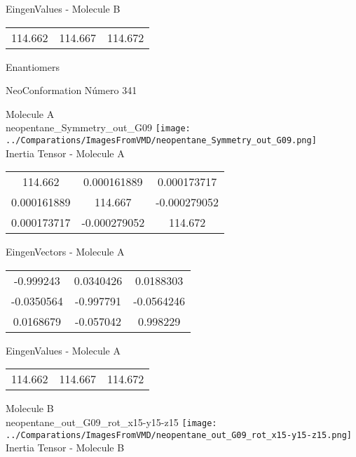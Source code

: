 \begin{multicols}{2}
\begin{center}
\vtab
 EingenValues - Molecule B     \\
\vtab
\begin{tabular}{|c c c|}
114.662	 & 	114.667	 & 	114.672	 \\
\end{tabular}

\end{center}
\end{multicols}
\begin{center}
\vtab
\vtab
\textcolor{NavyBlue}{\Large Enantiomers}
\end{center}

 \newpage

\vtab[-2cm]
\begin{center}
{\large NeoConformation \tab Número 341}
\end{center}
\begin{multicols}{2}
\begin{center}

Molecule A \\ 
neopentane\_Symmetry\_out\_G09
\texttt{[image: ../Comparations/ImagesFromVMD/neopentane\_Symmetry\_out\_G09.png]}
\\
Inertia Tensor - Molecule A \\
\vtab

\begin{tabular}{|c c c|}
114.662	 & 	0.000161889	 & 	0.000173717	 \\
0.000161889	 & 	114.667	 & 	-0.000279052	 \\
0.000173717	 & 	-0.000279052	 & 	114.672
\end{tabular}

\vtab
 EingenVectors - Molecule A     \\
\vtab
\begin{tabular}{|c c c|}
-0.999243	 & 	0.0340426	 & 	0.0188303	 \\
-0.0350564	 & 	-0.997791	 & 	-0.0564246	 \\
0.0168679	 & 	-0.057042	 & 	0.998229
\end{tabular}

\vtab
 EingenValues - Molecule A     \\
\vtab
\begin{tabular}{|c c c|}
114.662	 & 	114.667	 & 	114.672	 \\
\end{tabular}
\columnbreak

Molecule B \\ 
neopentane\_out\_G09\_rot\_x15-y15-z15
\texttt{[image: ../Comparations/ImagesFromVMD/neopentane\_out\_G09\_rot\_x15-y15-z15.png]}
\\
Inertia Tensor - Molecule B \\
\vtab


\end{center}
\end{multicols}
